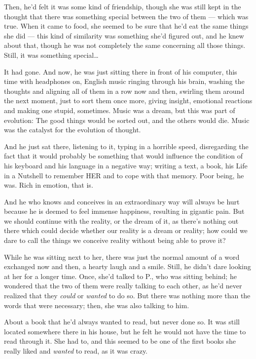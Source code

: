 Then, he'd felt it was some kind of friendship, though she was still kept in the thought that there was something special between the two of them --- which was true. When it came to food, she seemed to be sure that he'd eat the same things she did --- this kind of similarity was something she'd figured out, and he knew about that, though he was not completely the same concerning all those things. Still, it was something special\ldots

It had gone. And now, he was just sitting there in front of his computer, this time with headphones on, English music ringing through his brain, washing the thoughts and aligning all of them in a row now and then, swirling them around the next moment, just to sort them once more, giving insight, emotional reactions and making one stupid, sometimes. Music was a dream, but this was part of evolution: The good things would be sorted out, and the others would die. Music was the catalyst for the evolution of thought.

And he just sat there, listening to it, typing in a horrible speed, disregarding the fact that it would probably be something that would influence the condition of his keyboard and his language in a negative way; writing a text, a book, his Life in a Nutshell to remember HER and to cope with that memory. 
Poor being, he was. 
Rich in emotion, that is.

And he who knows and conceives in an extraordinary way will always be hurt because he is deemed to feel immense happiness, resulting in gigantic pain. 
But we should continue with the reality, or the dream of it, as there's nothing out there which could decide whether our reality is a dream or reality; how could we dare to call the things we conceive reality without being able to prove it?

While he was sitting next to her, there was just the normal amount of a word exchanged now and then, a hearty laugh and a smile. Still, he didn't dare looking at her for a longer time. Once, she'd talked to P., who was sitting behind; he wondered that the two of them were really talking to each other, as he'd never realized that they \emph{could} or \emph{wanted} to do so. But there was nothing more than the words that were necessary; then, she was also talking to him.

About a book that he'd always wanted to read, but never done so. It was still located somewhere there in his house, but he felt he would not have the time to read through it. She had to, and this seemed to be one of the first books she really liked and \emph{wanted} to read, as it was crazy.

